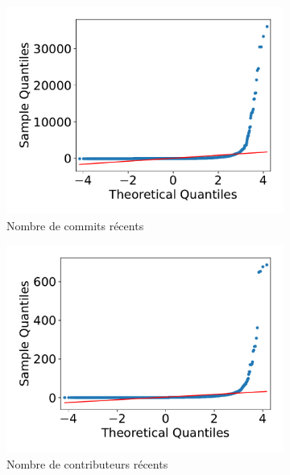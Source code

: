 \begin{figure}[ht]
    \begin{subfigure}[t]{0.3\textwidth}
        \includegraphics[width=\textwidth]{experiment/data_analysis/recentCommitCount_qqplot}
        \caption{Nombre de \glspl{commit} récents}
    \end{subfigure}
    \begin{subfigure}[t]{0.3\textwidth}
        \includegraphics[width=\textwidth]{experiment/data_analysis/recentContributorCount_qqplot}
        \caption{Nombre de contributeurs récents}
    \end{subfigure}%
    \begin{subfigure}[t]{0.3\textwidth}

\end{subfigure}
\end{figure}
